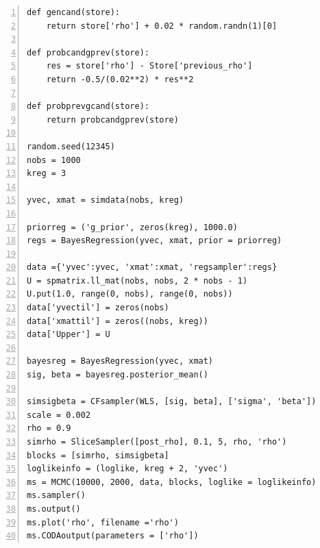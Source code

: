 \documentclass[article]{jss}
\begin{document}
\begin{lstlisting}[basicstyle={\scriptsize},numbers=left,tabsize=4]
def gencand(store):
    return store['rho'] + 0.02 * random.randn(1)[0]

def probcandgprev(store):
    res = store['rho'] - Store['previous_rho']
    return -0.5/(0.02**2) * res**2

def probprevgcand(store):
    return probcandgprev(store)

random.seed(12345)
nobs = 1000
kreg = 3

yvec, xmat = simdata(nobs, kreg)

priorreg = ('g_prior', zeros(kreg), 1000.0)
regs = BayesRegression(yvec, xmat, prior = priorreg)

data ={'yvec':yvec, 'xmat':xmat, 'regsampler':regs}
U = spmatrix.ll_mat(nobs, nobs, 2 * nobs - 1)
U.put(1.0, range(0, nobs), range(0, nobs))
data['yvectil'] = zeros(nobs)
data['xmattil'] = zeros((nobs, kreg))
data['Upper'] = U

bayesreg = BayesRegression(yvec, xmat)
sig, beta = bayesreg.posterior_mean()

simsigbeta = CFsampler(WLS, [sig, beta], ['sigma', 'beta'])
scale = 0.002                       
rho = 0.9
simrho = SliceSampler([post_rho], 0.1, 5, rho, 'rho')
blocks = [simrho, simsigbeta]
loglikeinfo = (loglike, kreg + 2, 'yvec')
ms = MCMC(10000, 2000, data, blocks, loglike = loglikeinfo)
ms.sampler()
ms.output()
ms.plot('rho', filename ='rho')
ms.CODAoutput(parameters = ['rho'])
\end{lstlisting}
\end{document}
